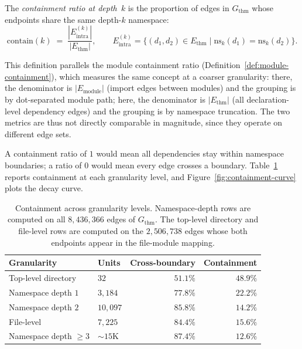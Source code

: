 \begin{definition}
\label{def:containment}
The \emph{containment ratio at depth~$k$} is the proportion of edges in $G_{\mathrm{thm}}$ whose endpoints share the same depth-$k$ namespace:
\[
  \mathrm{contain}(k) \;=\; \frac{|E_{\mathrm{intra}}^{(k)}|}{|E_{\mathrm{thm}}|},
  \qquad
  E_{\mathrm{intra}}^{(k)} = \{(d_1,d_2) \in E_{\mathrm{thm}} \mid \mathrm{ns}_k(d_1) = \mathrm{ns}_k(d_2)\}.
\]
\end{definition}

\noindent
This definition parallels the module containment ratio (Definition~\ref{def:module-containment}), which measures the same concept at a coarser granularity: there, the denominator is $|E_{\mathrm{module}}|$ (import edges between modules) and the grouping is by dot-separated module path; here, the denominator is $|E_{\mathrm{thm}}|$ (all declaration-level dependency edges) and the grouping is by namespace truncation. The two metrics are thus not directly comparable in magnitude, since they operate on different edge sets.

A containment ratio of $1$ would mean all dependencies stay within namespace boundaries; a ratio of $0$ would mean every edge crosses a boundary. Table~\ref{tab:containment-decay} reports containment at each granularity level, and Figure~\ref{fig:containment-curve} plots the decay curve.

\begin{table}[ht]
\centering
\caption[Containment across granularity levels]{Containment across granularity levels. Namespace-depth rows are computed on all $8{,}436{,}366$ edges of $G_{\mathrm{thm}}$. The top-level directory and file-level rows are computed on the $2{,}506{,}738$ edges whose both endpoints appear in the file-module mapping.\protect\footnotemark}
\label{tab:containment-decay}
\begin{tabular}{llrr}
\toprule
Granularity & Units & Cross-boundary & Containment \\
\midrule
Top-level directory             & $32$          & $51.1\%$ & $48.9\%$ \\
Namespace depth $1$             & $3{,}184$     & $77.8\%$ & $22.2\%$ \\
Namespace depth $2$             & $10{,}097$    & $85.8\%$ & $14.2\%$ \\
File-level                      & $7{,}225$     & $84.4\%$ & $15.6\%$ \\
Namespace depth $\ge 3$         & ${\sim}15$K   & $87.4\%$ & $12.6\%$ \\
\bottomrule
\end{tabular}
\end{table}

